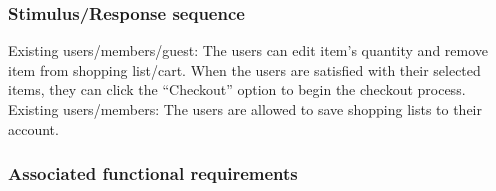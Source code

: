 \documentclass{scrreprt}
\theoremstyle{funreq}
\begin{document}
	\subsubsection{Stimulus/Response sequence}
	Existing users/members/guest:
	The users can edit item’s quantity and remove item from shopping list/cart. When the users are satisfied with their selected items, they can click the “Checkout” option to begin the checkout process. 
	Existing users/members:
	The users are allowed to save shopping lists to their account.
	
	
	\subsubsection{Associated functional requirements}
	
\end{document}

